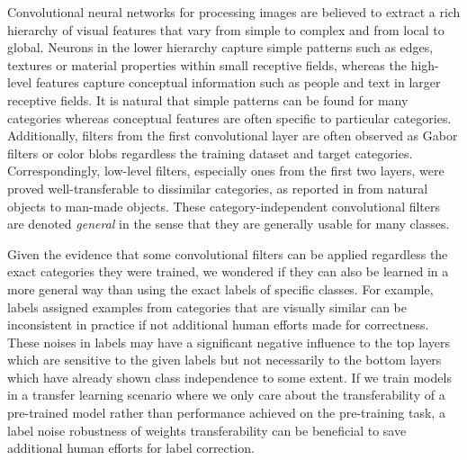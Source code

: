 Convolutional neural networks for processing images are believed to extract a rich hierarchy of visual features that vary from simple to complex and from local to global.\cite{girshick2014rich}
Neurons in the lower hierarchy capture simple patterns such as edges, textures or material properties within small receptive fields, whereas the high-level features capture conceptual information such as people and text in larger receptive fields.
It is natural that simple patterns can be found for many categories whereas conceptual features are often specific to particular categories.
Additionally, filters from the first convolutional layer are often observed as Gabor filters or color blobs regardless the training dataset and target categories.\cite{zeiler2014visualizing,lee2009convolutional,krizhevsky2012imagenet,shin2016deep}
Correspondingly, low-level filters, especially ones from the first two layers, were proved well-transferable to dissimilar categories, as reported in \cite{yosinski2014transferable} from natural objects to man-made objects.
These category-independent convolutional filters are denoted \textit{general} in the sense that they are generally usable for many classes.

Given the evidence that some convolutional filters can be applied regardless the exact categories they were trained, we wondered if they can also be learned in a more general way than using the exact labels of specific classes.
For example, labels assigned examples from categories that are visually similar can be inconsistent in practice if not additional human efforts made for correctness.
These noises in labels may have a significant negative influence to the top layers which are sensitive to the given labels but not necessarily to the bottom layers which have already shown class independence to some extent.
If we train models in a transfer learning scenario where we only care about the transferability of a pre-trained model rather than performance achieved on the pre-training task, a label noise robustness of weights transferability can be beneficial to save additional human efforts for label correction.


